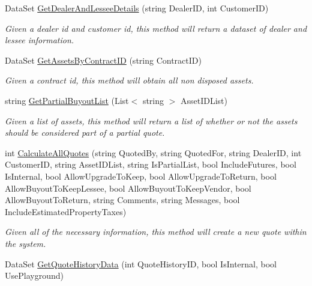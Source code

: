 \begin{DoxyCompactItemize}
Data\+Set \mbox{\hyperlink{class_g_f_s_c_1_1_services_1_1_end_of_term_1_1_end_of_term_service_acc90f4e6a7e6d367386c25f475ec90cb}{Get\+Dealer\+And\+Lessee\+Details}} (string Dealer\+ID, int Customer\+ID)
\begin{DoxyCompactList}\small\item\em Given a dealer id and customer id, this method will return a dataset of dealer and lessee information. \end{DoxyCompactList}\item 
Data\+Set \mbox{\hyperlink{class_g_f_s_c_1_1_services_1_1_end_of_term_1_1_end_of_term_service_aeff0831ea8a5b34217f8f85cf0d3d0db}{Get\+Assets\+By\+Contract\+ID}} (string Contract\+ID)
\begin{DoxyCompactList}\small\item\em Given a contract id, this method will obtain all non disposed assets. \end{DoxyCompactList}\item 
string \mbox{\hyperlink{class_g_f_s_c_1_1_services_1_1_end_of_term_1_1_end_of_term_service_af4e8a7b0ebd11bb35b36cc9b7b61516e}{Get\+Partial\+Buyout\+List}} (List$<$ string $>$ Asset\+I\+D\+List)
\begin{DoxyCompactList}\small\item\em Given a list of assets, this method will return a list of whether or not the assets should be considered part of a partial quote. \end{DoxyCompactList}\item 
int \mbox{\hyperlink{class_g_f_s_c_1_1_services_1_1_end_of_term_1_1_end_of_term_service_ae345ee720a60120f75acc11e00d44f47}{Calculate\+All\+Quotes}} (string Quoted\+By, string Quoted\+For, string Dealer\+ID, int Customer\+ID, string Asset\+I\+D\+List, string Is\+Partial\+List, bool Include\+Futures, bool Is\+Internal, bool Allow\+Upgrade\+To\+Keep, bool Allow\+Upgrade\+To\+Return, bool Allow\+Buyout\+To\+Keep\+Lessee, bool Allow\+Buyout\+To\+Keep\+Vendor, bool Allow\+Buyout\+To\+Return, string Comments, string Messages, bool Include\+Estimated\+Property\+Taxes)
\begin{DoxyCompactList}\small\item\em Given all of the necessary information, this method will create a new quote within the system. \end{DoxyCompactList}\item 
Data\+Set \mbox{\hyperlink{class_g_f_s_c_1_1_services_1_1_end_of_term_1_1_end_of_term_service_a55d1145f5df148dff61591f5fc93a502}{Get\+Quote\+History\+Data}} (int Quote\+History\+ID, bool Is\+Internal, bool Use\+Playground)

\end{DoxyCompactItemize}
